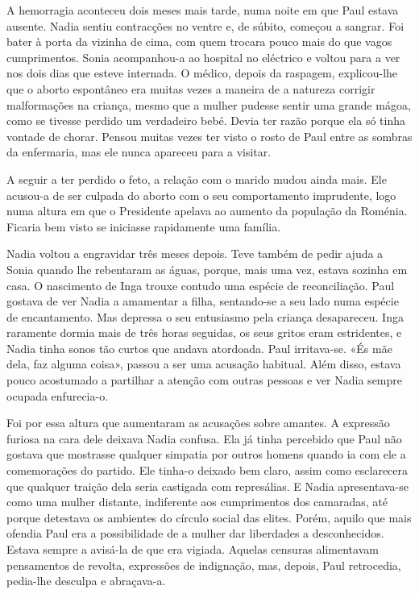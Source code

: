 A hemorragia aconteceu dois meses mais tarde, numa noite em que Paul
estava ausente. Nadia sentiu contracções no ventre e, de súbito,
começou a sangrar. Foi bater à porta da vizinha de cima, com quem
trocara pouco mais do que vagos cumprimentos. Sonia acompanhou-a ao
hospital no eléctrico e voltou para a ver nos dois dias que esteve
internada. O médico, depois da raspagem, explicou-lhe que o aborto
espontâneo era muitas vezes a maneira de a natureza corrigir
malformações na criança, mesmo que a mulher pudesse sentir uma grande
mágoa, como se tivesse perdido um verdadeiro bebé. Devia ter razão
porque ela só tinha vontade de chorar. Pensou muitas vezes ter visto o
rosto de Paul entre as sombras da enfermaria, mas ele nunca apareceu
para a visitar.

A seguir a ter perdido o feto, a relação com o marido
mudou ainda mais. Ele acusou-a de ser culpada do aborto com o seu
comportamento imprudente, logo numa altura em que o Presidente apelava
ao aumento da população
da Roménia. Ficaria bem visto se iniciasse rapidamente uma família.

Nadia voltou a engravidar três meses depois. Teve também de pedir
ajuda a Sonia quando lhe rebentaram as águas, porque, mais uma vez,
estava sozinha em casa. O nascimento de Inga trouxe contudo uma espécie
de reconciliação. Paul gostava de ver Nadia a amamentar a filha,
sentando-se a seu lado numa espécie de encantamento. Mas depressa o
seu entusiasmo pela criança desapareceu. Inga raramente dormia mais de
três horas seguidas, os seus gritos eram estridentes, e Nadia tinha
sonos tão curtos que andava atordoada. Paul irritava-se. «És mãe dela,
faz alguma coisa», passou a ser uma acusação habitual. Além disso,
estava pouco acostumado a partilhar a atenção com outras pessoas e ver
Nadia sempre ocupada enfurecia-o.

Foi por essa altura que aumentaram as acusações
sobre amantes. A expressão furiosa na cara dele deixava Nadia confusa.
Ela já tinha percebido que Paul não gostava que mostrasse qualquer
simpatia por outros homens quando ia com ele a comemorações do partido.
Ele tinha-o deixado bem claro, assim como esclarecera que qualquer
traição dela seria castigada com represálias. E Nadia apresentava-se
como uma mulher distante, indiferente aos cumprimentos dos camaradas,
até porque detestava os ambientes do círculo social das elites. Porém,
aquilo que mais ofendia Paul era a possibilidade de a mulher dar
liberdades a desconhecidos. Estava sempre a avisá-la de que era vigiada.
Aquelas censuras alimentavam pensamentos de revolta, expressões de
indignação, mas, depois, Paul retrocedia, pedia-lhe desculpa e abraçava-a.

